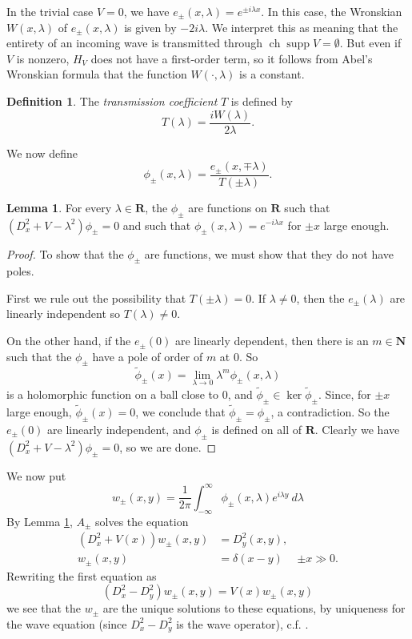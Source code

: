 \documentclass[12pt]{report}
\newcommand{\NN}{\mathbf{N}}
\newcommand{\RR}{\mathbf{R}}
\DeclareMathOperator{\ch}{ch}
\DeclareMathOperator{\supp}{supp}
\newcommand{\dfn}[1]{\emph{#1}\index{#1}}
\theoremstyle{definition}
\newtheorem{lemma}[theorem]{Lemma}
\newtheorem{definition}[theorem]{Definition}
\begin{document}
In the trivial case $V = 0$, we have $e_\pm(x, \lambda) = e^{\pm i\lambda x}$. In this case, the Wronskian $W(x, \lambda)$ of $e_\pm(x, \lambda)$ is given by $-2i\lambda$. We interpret this as meaning that the entirety of an incoming wave is transmitted through $\ch \supp V = \emptyset$. But even if $V$ is nonzero, $H_V$ does not have a first-order term, so it follows from Abel's Wronskian formula that the function $W(\cdot, \lambda)$ is a constant.

\begin{definition}
The \dfn{transmission coefficient} $T$ is defined by
$$T(\lambda) = \frac{iW(\lambda)}{2\lambda}.$$
\end{definition}

We now define
$$\phi_\pm(x, \lambda) = \frac{e_\pm(x, \mp \lambda)}{T(\pm \lambda)}.$$

\begin{lemma}
\label{construction of intertwining, part 1}
For every $\lambda \in \RR$, the $\phi_\pm$ are functions on $\RR$ such that $(D_x^2 + V - \lambda^2)\phi_\pm = 0$ and such that $\phi_\pm(x, \lambda) = e^{-i\lambda x}$ for $\pm x$ large enough.
\end{lemma}
\begin{proof}
To show that the $\phi_\pm$ are functions, we must show that they do not have poles.

First we rule out the possibility that $T(\pm \lambda) = 0$. If $\lambda \neq 0$, then the $e_\pm(\lambda)$ are linearly independent %
so $T(\lambda) \neq 0$.

On the other hand, if the $e_\pm(0)$ are linearly dependent, then there is an $m \in \NN$ such that the $\phi_\pm$ have a pole of order of $m$ at $0$. So
$$\tilde \phi_\pm(x) = \lim_{\lambda \to 0} \lambda^m\phi_\pm(x, \lambda)$$
is a holomorphic function on a ball close to $0$, and $\tilde \phi_\pm \in \ker \tilde \phi_\pm$. Since, for $\pm x$ large enough, $\tilde \phi_\pm(x) = 0$, we conclude that $\tilde \phi_\pm = \phi_\pm$, a contradiction. So the $e_\pm(0)$ are linearly independent, and $\phi_\pm$ is defined on all of $\RR$. Clearly we have $(D_x^2 + V - \lambda^2)\phi_\pm = 0$, so we are done.
\end{proof}

We now put
$$w_\pm(x, y) = \frac{1}{2\pi} \int_{-\infty}^\infty \phi_\pm(x, \lambda)e^{i\lambda y} ~d\lambda$$
By Lemma \ref{construction of intertwining, part 1}, $A_\pm$ solves the equation
\begin{align*}
  (D_x^2 + V(x))w_\pm(x, y) &= D_y^2(x, y),\\
  w_\pm(x, y) &= \delta(x - y) &\pm x \gg 0.
\end{align*}
Rewriting the first equation as
$$(D_x^2 - D_y^2)w_\pm(x, y) = V(x)w_\pm(x, y)$$
we see that the $w_\pm$ are the unique solutions to these equations, by uniqueness for the wave equation (since $D_x^2 - D_y^2$ is the wave operator), c.f. \cite[\S2.4.3]{evans10}.
\end{document}

